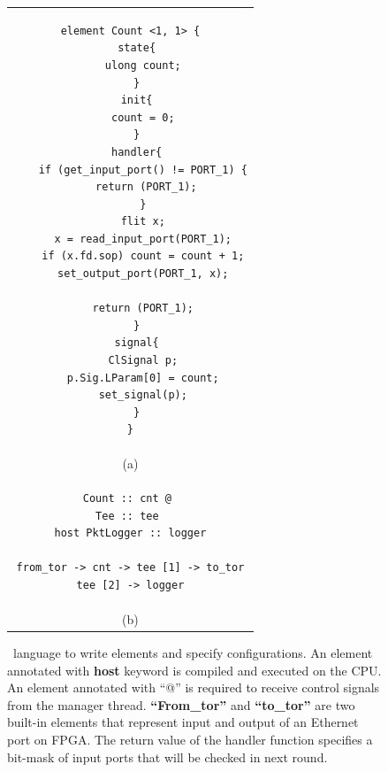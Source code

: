 \begin{figure}[t!]
\scriptsize \lstset{style=numbers}

\centering
\begin{tabular}{c}

\begin{lstlisting}
element Count <1, 1> {
  state{
    ulong count;
  }
  init{
    count = 0;
  }
  handler{
    if (get_input_port() != PORT_1) {
      return (PORT_1); 
    }
    flit x;
    x = read_input_port(PORT_1);
    if (x.fd.sop) count = count + 1;
    set_output_port(PORT_1, x);
   
    return (PORT_1);
  }
  signal{
    ClSignal p;
    p.Sig.LParam[0] = count;
    set_signal(p);
  }
}
\end{lstlisting} \vspace{3pt} \\
{\normalsize \centering (a)} \vspace{3pt} \\
\begin{lstlisting}
Count :: cnt @ 
Tee :: tee 
host PktLogger :: logger

from_tor -> cnt -> tee [1] -> to_tor
tee [2] -> logger
\end{lstlisting} \vspace{3pt} \\
{\normalsize \centering (b)} 
\end{tabular}
\caption{\name\ language to write elements and specify configurations. An element annotated with \textbf{host} keyword is compiled and executed on the CPU. An element annotated with ``@'' is required to receive control signals from the manager thread. 
\textbf{``From\_tor''} and \textbf{``to\_tor''} are two built-in elements that represent input and output of an Ethernet port on FPGA. The return value of the handler function specifies
a bit-mask of input ports that will be checked in next round.}
\label{fig:lang}
\vspace{-10pt}
\end{figure}

